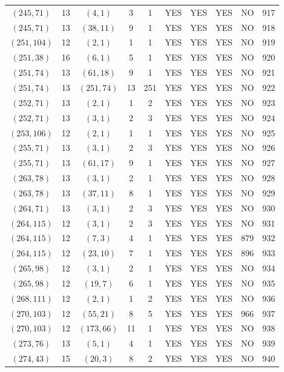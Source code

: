 \begin{longtable}{|c|c|c|c|c|c|c|c|c|c|}
$(245, 71)$ & 13 & $(4, 1)$ & 3 & 1 & YES & YES & YES & NO & 917\\
$(245, 71)$ & 13 & $(38, 11)$ & 9 & 1 & YES & YES & YES & NO & 918\\
$(251, 104)$ & 12 & $(2, 1)$ & 1 & 1 & YES & YES & YES & NO & 919\\
$(251, 38)$ & 16 & $(6, 1)$ & 5 & 1 & YES & YES & YES & NO & 920\\
$(251, 74)$ & 13 & $(61, 18)$ & 9 & 1 & YES & YES & YES & NO & 921\\
$(251, 74)$ & 13 & $(251, 74)$ & 13 & 251 & YES & YES & YES & NO & 922\\
$(252, 71)$ & 13 & $(2, 1)$ & 1 & 2 & YES & YES & YES & NO & 923\\
$(252, 71)$ & 13 & $(3, 1)$ & 2 & 3 & YES & YES & YES & NO & 924\\
$(253, 106)$ & 12 & $(2, 1)$ & 1 & 1 & YES & YES & YES & NO & 925\\
$(255, 71)$ & 13 & $(3, 1)$ & 2 & 3 & YES & YES & YES & NO & 926\\
$(255, 71)$ & 13 & $(61, 17)$ & 9 & 1 & YES & YES & YES & NO & 927\\
$(263, 78)$ & 13 & $(3, 1)$ & 2 & 1 & YES & YES & YES & NO & 928\\
$(263, 78)$ & 13 & $(37, 11)$ & 8 & 1 & YES & YES & YES & NO & 929\\
$(264, 71)$ & 13 & $(3, 1)$ & 2 & 3 & YES & YES & YES & NO & 930\\
$(264, 115)$ & 12 & $(3, 1)$ & 2 & 3 & YES & YES & YES & NO & 931\\
$(264, 115)$ & 12 & $(7, 3)$ & 4 & 1 & YES & YES & YES & 879 & 932\\
$(264, 115)$ & 12 & $(23, 10)$ & 7 & 1 & YES & YES & YES & 896 & 933\\
$(265, 98)$ & 12 & $(3, 1)$ & 2 & 1 & YES & YES & YES & NO & 934\\
$(265, 98)$ & 12 & $(19, 7)$ & 6 & 1 & YES & YES & YES & NO & 935\\
$(268, 111)$ & 12 & $(2, 1)$ & 1 & 2 & YES & YES & YES & NO & 936\\
$(270, 103)$ & 12 & $(55, 21)$ & 8 & 5 & YES & YES & YES & 966 & 937\\
$(270, 103)$ & 12 & $(173, 66)$ & 11 & 1 & YES & YES & YES & NO & 938\\
$(273, 76)$ & 13 & $(5, 1)$ & 4 & 1 & YES & YES & YES & NO & 939\\
$(274, 43)$ & 15 & $(20, 3)$ & 8 & 2 & YES & YES & YES & NO & 940\\

\end{longtable}

